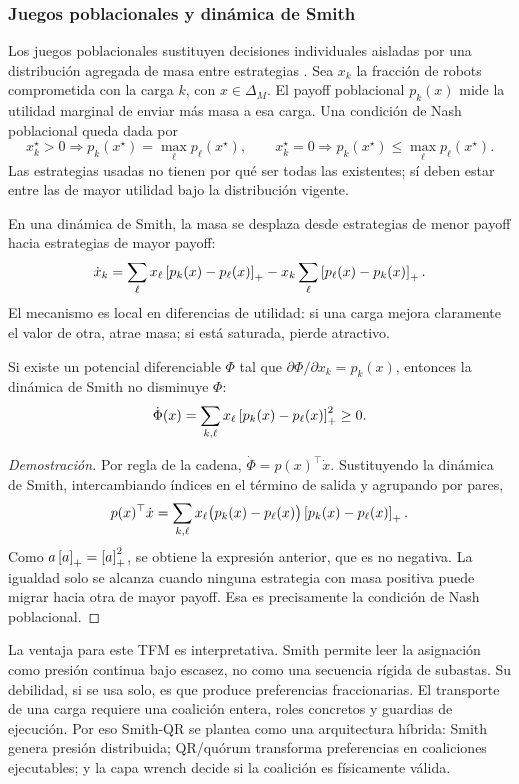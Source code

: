 \subsubsection{Juegos poblacionales y dinámica de Smith}

Los juegos poblacionales sustituyen decisiones individuales aisladas por una distribución
agregada de masa entre estrategias \citep{sandholm2010population,quijano2017population}.
Sea $x_k$ la fracción de robots comprometida con la carga $k$, con
$x\in\Delta_M$. El payoff poblacional $p_k(x)$ mide la utilidad marginal de enviar más
masa a esa carga. Una condición de Nash poblacional queda dada por
\[
  x_k^\star>0 \Rightarrow p_k(x^\star)=\max_{\ell}p_\ell(x^\star),
  \qquad
  x_k^\star=0 \Rightarrow p_k(x^\star)\leq\max_{\ell}p_\ell(x^\star).
\]
Las estrategias usadas no tienen por qué ser todas las existentes; sí deben estar entre
las de mayor utilidad bajo la distribución vigente.

En una dinámica de Smith, la masa se desplaza desde estrategias de menor payoff hacia
estrategias de mayor payoff:
\[
  \dot x_k =
  \sum_{\ell} x_{\ell}\left[p_k(x)-p_{\ell}(x)\right]_{+}
  - x_k\sum_{\ell}\left[p_{\ell}(x)-p_k(x)\right]_{+} .
\]
El mecanismo es local en diferencias de utilidad: si una carga mejora claramente el
valor de otra, atrae masa; si está saturada, pierde atractivo.

\begin{proposicion}
Si existe un potencial diferenciable $\Phi$ tal que
$\partial\Phi/\partial x_k=p_k(x)$, entonces la dinámica de Smith no disminuye
$\Phi$:
\[
  \dot\Phi(x)=
  \sum_{k,\ell}x_{\ell}\left[p_k(x)-p_{\ell}(x)\right]_{+}^2\geq 0 .
\]
\end{proposicion}

\begin{proof}[Demostración]
Por regla de la cadena, $\dot\Phi=p(x)^\top\dot x$. Sustituyendo la dinámica de Smith,
intercambiando índices en el término de salida y agrupando por pares,
\[
  p(x)^\top\dot x =
  \sum_{k,\ell}x_{\ell}
  \bigl(p_k(x)-p_{\ell}(x)\bigr)
  \left[p_k(x)-p_{\ell}(x)\right]_{+} .
\]
Como $a\left[a\right]_{+}=\left[a\right]_{+}^2$, se obtiene la expresión anterior, que es no negativa. La
igualdad solo se alcanza cuando ninguna estrategia con masa positiva puede migrar hacia
otra de mayor payoff. Esa es precisamente la condición de Nash poblacional.
\end{proof}

La ventaja para este TFM es interpretativa. Smith permite leer la asignación como presión
continua bajo escasez, no como una secuencia rígida de subastas. Su debilidad, si se usa
solo, es que produce preferencias fraccionarias. El transporte de una carga requiere una
coalición entera, roles concretos y guardias de ejecución. Por eso Smith-QR se plantea
como una arquitectura híbrida: Smith genera presión distribuida; QR/quórum transforma
preferencias en coaliciones ejecutables; y la capa wrench decide si la coalición es
físicamente válida.

